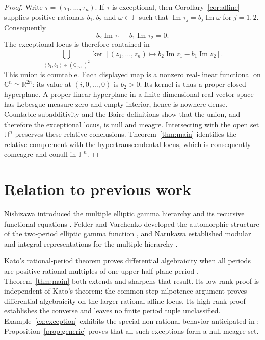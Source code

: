 \documentclass[11pt]{article}
\numberwithin{equation}{section}
\theoremstyle{definition}
\theoremstyle{remark}
\newcommand{\C}{\mathbb C}
\newcommand{\Q}{\mathbb Q}
\newcommand{\R}{\mathbb R}
\newcommand{\HH}{\mathbb H}
\begin{document}
\begin{proof}
Write $\tau=(\tau_1,\ldots,\tau_n)$.  If $\tau$ is exceptional, then
Corollary~\ref{cor:affine} supplies positive rationals $b_1,b_2$ and
$\omega\in\HH$ such that
$\operatorname{Im}\tau_j=b_j\operatorname{Im}\omega$ for $j=1,2$.
Consequently
\[
 b_2\operatorname{Im}\tau_1-b_1\operatorname{Im}\tau_2=0.
\]
The exceptional locus is therefore contained in
\[
 \bigcup_{(b_1,b_2)\in(\Q_{>0})^2}
 \ker\!\left[
   (z_1,\ldots,z_n)\longmapsto
   b_2\operatorname{Im}z_1-b_1\operatorname{Im}z_2
 \right].
\]
This union is countable.  Each displayed map is a nonzero real-linear
functional on $\C^n\simeq\R^{2n}$: its value at $(i,0,\ldots,0)$ is
$b_2>0$.  Its kernel is thus a proper closed hyperplane.  A proper linear
hyperplane in a finite-dimensional real vector space has Lebesgue measure
zero and empty interior, hence is nowhere dense.  Countable subadditivity
and the Baire definitions show that the union, and therefore the exceptional
locus, is null and meagre.  Intersecting with the open set $\HH^n$ preserves
these relative conclusions.  Theorem~\ref{thm:main} identifies the relative
complement with the hypertranscendental locus, which is consequently
comeagre and conull in $\HH^n$.
\end{proof}

\section{Relation to previous work}
\label{sec:prior}

Nishizawa introduced the multiple elliptic gamma hierarchy and its recursive
functional equations \cite{Nishizawa2001}.  Felder and Varchenko developed
the automorphic structure of the two-period elliptic gamma function
\cite{FelderVarchenko2000}, and Narukawa established modular and integral
representations for the multiple hierarchy \cite{Narukawa2004}.

Kato's rational-period theorem proves differential algebraicity when all
periods are positive rational multiples of one upper-half-plane period
\cite[Theorem~1.1]{Kato2021}.  Theorem~\ref{thm:main} both extends and
sharpens that result.  Its low-rank proof is independent of Kato's theorem:
the common-step nilpotence argument proves differential algebraicity on the
larger rational-affine locus.  Its high-rank proof establishes the converse
and leaves no finite period tuple unclassified.  Example~\ref{ex:exception}
exhibits the special non-rational behavior anticipated in
\cite[Remark~1.2]{Kato2021}; Proposition~\ref{prop:generic} proves that all
such exceptions form a null meagre set.
\end{document}
